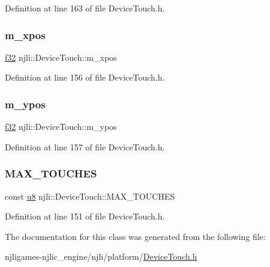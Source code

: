 Definition at line 163 of file Device\+Touch.\+h.

\mbox{\label{classnjli_1_1_device_touch_aa459469f52287f2085402117c13512f8}} 
\subsubsection{\texorpdfstring{m\+\_\+xpos}{m\_xpos}}
{\footnotesize\ttfamily \mbox{\hyperlink{_util_8h_a5f6906312a689f27d70e9d086649d3fd}{f32}} njli\+::\+Device\+Touch\+::m\+\_\+xpos\hspace{0.3cm}{\ttfamily [private]}}



Definition at line 156 of file Device\+Touch.\+h.

\mbox{\label{classnjli_1_1_device_touch_aec3c40c2adb1ba1bf5a13bf366bd3b6d}} 
\subsubsection{\texorpdfstring{m\+\_\+ypos}{m\_ypos}}
{\footnotesize\ttfamily \mbox{\hyperlink{_util_8h_a5f6906312a689f27d70e9d086649d3fd}{f32}} njli\+::\+Device\+Touch\+::m\+\_\+ypos\hspace{0.3cm}{\ttfamily [private]}}



Definition at line 157 of file Device\+Touch.\+h.

\mbox{\label{classnjli_1_1_device_touch_a8f2f389056e9750d3cee41875987c4fa}} 
\subsubsection{\texorpdfstring{M\+A\+X\+\_\+\+T\+O\+U\+C\+H\+ES}{MAX\_TOUCHES}}
{\footnotesize\ttfamily const \mbox{\hyperlink{_util_8h_aed742c436da53c1080638ce6ef7d13de}{u8}} njli\+::\+Device\+Touch\+::\+M\+A\+X\+\_\+\+T\+O\+U\+C\+H\+ES\hspace{0.3cm}{\ttfamily [static]}}



Definition at line 151 of file Device\+Touch.\+h.



The documentation for this class was generated from the following file\+:\begin{DoxyCompactItemize}
\item 
njligames-\/njlic\+\_\+engine/njli/platform/\mbox{\hyperlink{_device_touch_8h}{Device\+Touch.\+h}}\end{DoxyCompactItemize}
